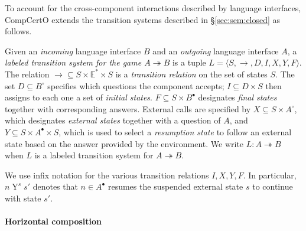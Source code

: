 \documentclass[sigplan,screen]{acmart}
\newcommand{\que}{\circ}
\newcommand{\ans}{\bullet}
\newenvironment{optional}{}{}
\begin{document}
To account for the cross-component interactions
described by language interfaces,
CompCertO extends
the transition systems described in \S\ref{sec:sem:closed}
as follows.

\begin{definition} \label{def:lts}
Given an \emph{incoming} language interface $B$
and an \emph{outgoing} language interface $A$,
a \emph{labeled transition system for the game $A \twoheadrightarrow B$}
is a tuple $L = \langle S, \rightarrow, D, I, X, Y, F \rangle$.
The relation
${\rightarrow} \subseteq S \times \mathbb{E}^* \times S$ is
a \emph{transition relation} on the set of states $S$.
The set $D \subseteq B^\que$ specifies which
questions the component accepts;
$I \subseteq D \times S$ then
assigns to each one a set of \emph{initial states}.
$F \subseteq S \times B^\ans$
designates \emph{final states} together with corresponding answers.
External calls are specified by
$X \subseteq S \times A^\que$,
which designates \emph{external states} together with
a question of $A$, and
$Y \subseteq S \times A^\ans \times S$,
which is used to select a \emph{resumption state}
to follow an external state
based on the answer provided by the environment.
We write $L : A \twoheadrightarrow B$ when
$L$ is a labeled transition system for $A \twoheadrightarrow B$.
\end{definition}

We use infix notation for the various transition relations
$I, X, Y, F$.
In particular, $n \mathrel{Y}^s s'$
denotes that $n \in A^\ans$
resumes the suspended external state $s$
to continue with state $s'$.



\paragraph{Horizontal composition} \label{sec:sem:linker} %
\end{document}
